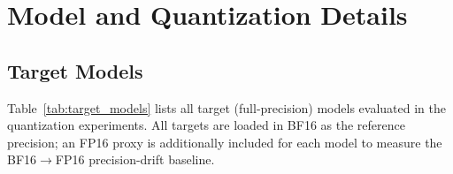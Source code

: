 
\section{Model and Quantization Details}
\label{app:model_details}

\subsection{Target Models}

Table~\ref{tab:target_models} lists all target (full-precision) models evaluated in the quantization experiments.
All targets are loaded in BF16 as the reference precision; an FP16 proxy is additionally included for each model to measure the BF16$\to$FP16 precision-drift baseline.

